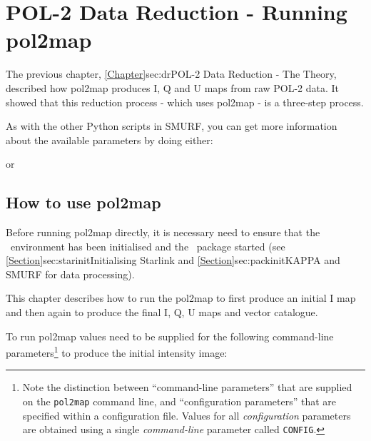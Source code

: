 \chapter{POL-2 Data Reduction - Running
  pol2map}
\label{sec:rundr}

The previous chapter, \cref{Chapter}{sec:dr}{POL-2 Data Reduction -
  The Theory}, described how pol2map produces I, Q and U maps from raw
POL-2 data.  It showed that this reduction process - which uses
pol2map - is a three-step process.

As with the other Python scripts in SMURF, you can get more
information about the available parameters by doing either:
\begin{terminalv}
\end{terminalv}
or
\begin{terminalv}
\end{terminalv}

\section{How to use pol2map}

Before running pol2map directly, it is necessary need to ensure that
the \starlink\ environment has been initialised and the \smurf\
package started (see \cref{Section}{sec:starinit}{Initialising
  Starlink} and \cref{Section}{sec:packinit}{KAPPA and SMURF for data
  processing}).

This chapter describes how to run the pol2map to first produce an
initial I map and then again to produce the final I, Q, U maps and
vector catalogue.

To run pol2map values need to be supplied for the following
command-line parameters\footnote{Note the distinction between
  ``command-line parameters'' that are supplied on the
  \texttt{pol2map} command line, and ``configuration parameters'' that
  are specified within a configuration file. Values for all
  \emph{configuration} parameters are obtained using a single
  \emph{command-line} parameter called \texttt{CONFIG}.} to produce
the initial intensity image:



